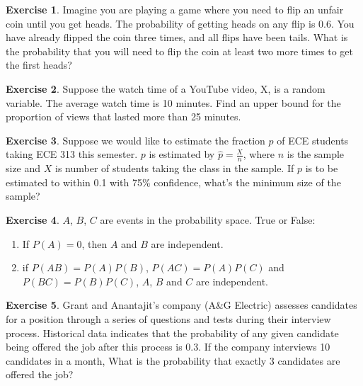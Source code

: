 \documentclass[12pt]{amsart}
\theoremstyle{definition}
\newtheorem{exercise}{Exercise}
\numberwithin{equation}{section}
\theoremstyle{plain}
\begin{document}
\begin{exercise}
    Imagine you are playing a game where you need to flip an unfair coin until you get heads. The probability of getting heads on any flip is 0.6. You have already flipped the coin three times, and all flips have been tails. What is the probability that you will need to flip the coin at least two more times to get the first heads? %
\end{exercise}

\begin{exercise}
    Suppose the watch time of a YouTube video, X, is a random variable. The average watch time is 10 minutes. Find an upper bound for the proportion of views that lasted more than 25 minutes. %
\end{exercise}

\begin{exercise}
    Suppose we would like to estimate the fraction $p$ of ECE students taking ECE 313 this semester. $p$ is estimated by $\widehat{p}=\frac{X}{n}$, where $n$ is the sample size and $X$ is number of students taking the class in the sample. If $p$ is to be estimated to within 0.1 with 75\% confidence, what’s the minimum size of the sample? %
\end{exercise}

\begin{exercise}
    $A$, $B$, $C$ are events in the probability space. True or False:
    \begin{enumerate}[label=(\Alph*)]
        \item If $P(A)=0$, then $A$ and $B$ are independent.
        \item if $P(AB) = P(A)P(B)$, $P(AC) = P(A)P(C)$ and $P(BC) = P(B)P(C)$, $A$, $B$ and $C$ are independent. 
    \end{enumerate}
\end{exercise}

\begin{exercise}
    Grant and Anantajit's company (A\&G Electric) assesses candidates for a position through a series of questions and tests during their interview process. Historical data indicates that the probability of any given candidate being offered the job after this process is 0.3. If the company interviews 10 candidates in a month, What is the probability that exactly 3 candidates are offered the job?%
\end{exercise}
\end{document}
